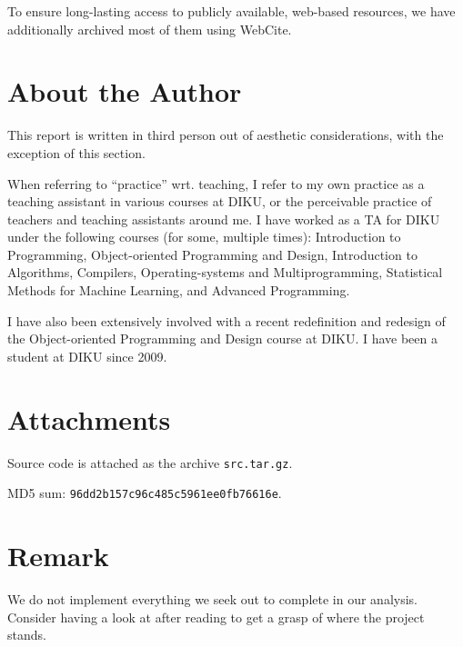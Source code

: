 To ensure long-lasting access to publicly available, web-based resources, we
have additionally archived most of them using
WebCite\textsuperscript{\textregistered}.

\section{About the Author}

This report is written in third person out of aesthetic considerations, with
the exception of this section.

When referring to ``practice'' wrt. teaching, I refer to my own practice as a
teaching assistant in various courses at DIKU, or the perceivable practice of
teachers and teaching assistants around me. I have worked as a TA for DIKU
under the following courses (for some, multiple times): Introduction to
Programming, Object-oriented Programming and Design, Introduction to
Algorithms, Compilers, Operating-systems and Multiprogramming, Statistical
Methods for Machine Learning, and Advanced Programming.

I have also been extensively involved with a recent redefinition and redesign
of the Object-oriented Programming and Design course at DIKU. I have been a
student at DIKU since 2009.

\section{Attachments}

Source code is attached as the archive \texttt{src.tar.gz}.

\noindent MD5 sum: \texttt{96dd2b157c96c485c5961ee0fb76616e}.

\section{Remark}

We do not implement everything we seek out to complete in our analysis.
Consider having a look at  after reading
 to get a grasp of where the project stands.
